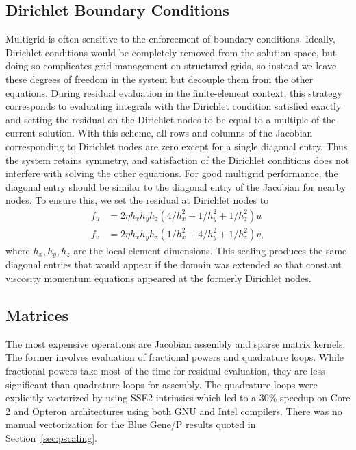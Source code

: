 \documentclass[draft,lineno,jgrga]{AGUTeX}
\begin{document}
\begin{article}
\subsection{Dirichlet Boundary Conditions}\label{ssec:dirichlet}
Multigrid is often sensitive to the enforcement of boundary conditions.  Ideally, Dirichlet
conditions would be completely removed from the solution space, but doing so complicates grid
management on structured grids, so instead we leave these degrees of freedom in the system but
decouple them from the other equations.  During residual evaluation in the finite-element context,
this strategy corresponds to evaluating integrals with the Dirichlet condition satisfied exactly and setting
the residual on the Dirichlet nodes to be equal to a multiple of the current solution.  With this
scheme, all rows and columns of the Jacobian corresponding to Dirichlet nodes are zero except for a
single diagonal entry. Thus the system retains symmetry, and satisfaction of the Dirichlet conditions
does not interfere with solving the other equations.  For good multigrid performance, the diagonal
entry should be similar to the diagonal entry of the Jacobian for nearby nodes.  To ensure this, we
set the residual at Dirichlet nodes to
\begin{equation}\label{eq:dirichlet-scale}
  \begin{split}
    f_u &= 2 \eta h_xh_yh_z (4/h_x^2 + 1/h_y^2 + 1/h_z^2) u \\
    f_v &= 2 \eta h_xh_yh_z (1/h_x^2 + 4/h_y^2 + 1/h_z^2) v,
  \end{split}
\end{equation}
where $h_x,h_y,h_z$ are the local element dimensions.  This scaling produces the same diagonal
entries that would appear if the domain was extended so that constant viscosity momentum equations
appeared at the formerly Dirichlet nodes.

\subsection{Matrices}
The most expensive operations are Jacobian assembly and sparse matrix kernels.  The former involves evaluation of fractional powers and quadrature loops.  While fractional powers take most of the time for residual evaluation, they are less significant than quadrature loops for assembly.  The quadrature loops were explicitly vectorized by using SSE2 intrinsics which led to a 30\% speedup on Core 2 and Opteron architectures using both GNU and Intel compilers.  There was no manual vectorization for the Blue Gene/P results quoted in Section~\ref{sec:pscaling}.


\end{article}
\end{document}

